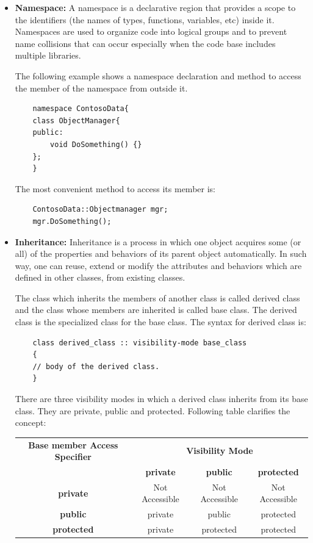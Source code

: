 \documentclass[main]{subfiles}
\begin{document}
\begin{itemize}
    \item\textbf{Namespace:} A namespace is a declarative region that provides a scope to the identifiers (the names of types, functions, variables, etc) inside it. Namespaces are used to organize code into logical groups and to prevent name collisions that can occur especially when the code base includes multiple libraries.
    
    The following example shows a namespace declaration and method to access the member of the namespace from outside it.

    \begin{verbatim}
    namespace ContosoData{
    class ObjectManager{
    public:
        void DoSomething() {}
    };
    }
    \end{verbatim}

    The most convenient method to access its member is:
    \begin{verbatim}
    ContosoData::Objectmanager mgr;
    mgr.DoSomething();
    \end{verbatim}
     
    \item\textbf{Inheritance:} Inheritance is a process in which one object acquires some (or all) of the properties and behaviors of its parent object automatically. In such way, one can reuse, extend or modify the attributes and behaviors which are defined in other classes, from existing classes.
    
    The class which inherits the members of another class is called derived class and the class whose members are inherited is called base class. The derived class is the specialized class for the base class.
    The syntax for derived class is:
    \begin{verbatim}
    class derived_class :: visibility-mode base_class  
    {  
    // body of the derived class.  
    }  
    \end{verbatim}
    
    There are three visibility modes in which a derived class inherits from its base class. They are private, public and protected. Following table clarifies the concept:
    \begin{center}
    \begin{table}[H]
        \begin{tabular}{|c|c|c|c|}
            \hline
            \textbf{Base member Access Specifier} & \multicolumn{3}{|c|}{\textbf{Visibility Mode}}  \\
             & \textbf{private} & \textbf{public} & \textbf{protected} \\
             \hline
             \textbf{private} & Not Accessible & Not Accessible & Not Accessible \\
             \hline
             \textbf{public} & private & public & protected \\
             \hline
             \textbf{protected} & private & protected & protected \\
             \hline
            

\end{tabular}
\end{table}
\end{center}
\end{itemize}
\end{document}
